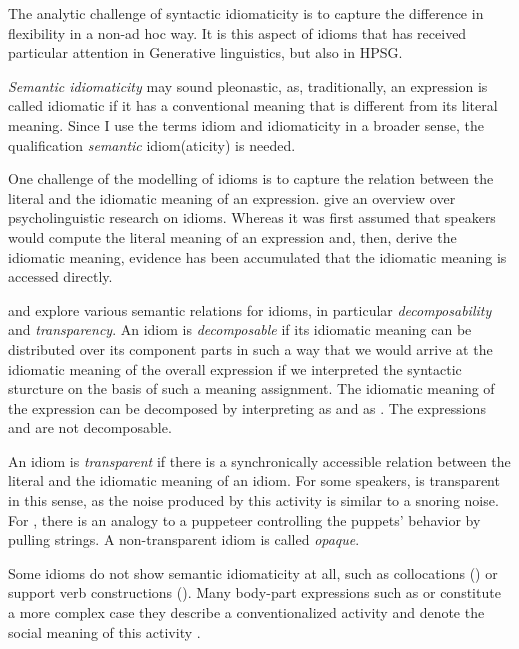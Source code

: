 \documentclass[output=paper]{langsci/langscibook}
\begin{document}
The analytic challenge of syntactic idiomaticity is to capture the difference in flexibility in a non-ad hoc way. It is this aspect of idioms that has received particular attention in Generative linguistics, but also in HPSG.

\medskip%

\emph{Semantic idiomaticity} may sound pleonastic, as, traditionally, an expression is called idiomatic if it has a conventional meaning that is different from its literal meaning. 
Since I use the terms idiom and idiomaticity in a broader sense, the qualification \emph{semantic} idiom(aticity) is needed. 

One challenge of the modelling of idioms is to capture the relation between the literal and the idiomatic meaning of an expression.
\cite{Gibbs:Colston:07} give an overview over 
psycholinguistic research on idioms. Whereas it was first assumed that speakers would compute the literal meaning of an expression and, then, derive the idiomatic meaning, evidence has been accumulated that the idiomatic meaning is accessed directly.

\cite{WSN84a-u} and \cite{NSW94a} explore various semantic relations for idioms, in particular \emph{decomposability}  and \emph{transparency}.
An idiom is \emph{decomposable} if its idiomatic meaning can be distributed over its component parts in such a way that we would arrive at the idiomatic meaning of the overall expression if we interpreted the syntactic sturcture on the basis of such a meaning assignment. 
The idiomatic meaning of the expression  can be decomposed by interpreting  as  and  as . 
The expressions  and  are not decomposable.

An idiom is \emph{transparent} if there is a synchronically accessible relation between the literal and the idiomatic meaning of an idiom. 
For some speakers,  is transparent in this sense, as the noise produced by this activity is similar to a snoring noise. 
For , there is an analogy to a puppeteer controlling the puppets' behavior by pulling strings. A non-transparent idiom is called \emph{opaque}. 

Some idioms do not show semantic idiomaticity at all, such as collocations () or support verb constructions (). 
Many body-part expressions such as  or  constitute a more complex case they describe a conventionalized activity and denote the social meaning of this activity \citep{Burger:76}.
\end{document}
